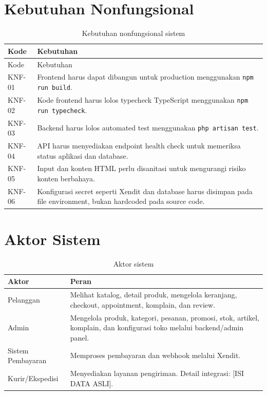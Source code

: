 \documentclass[12pt,a4paper]{report}
\begin{document}
\section{Kebutuhan Nonfungsional}
\begin{longtable}{p{}p{}}
\caption{Kebutuhan nonfungsional sistem}\\
\toprule
Kode & Kebutuhan \\
\midrule
\endfirsthead
\toprule
Kode & Kebutuhan \\
\midrule
\endhead
KNF-01 & Frontend harus dapat dibangun untuk production menggunakan \texttt{npm run build}. \\
KNF-02 & Kode frontend harus lolos typecheck TypeScript menggunakan \texttt{npm run typecheck}. \\
KNF-03 & Backend harus lolos automated test menggunakan \texttt{php artisan test}. \\
KNF-04 & API harus menyediakan endpoint health check untuk memeriksa status aplikasi dan database. \\
KNF-05 & Input dan konten HTML perlu disanitasi untuk mengurangi risiko konten berbahaya. \\
KNF-06 & Konfigurasi secret seperti Xendit dan database harus disimpan pada file environment, bukan hardcoded pada source code. \\
\bottomrule
\end{longtable}

\section{Aktor Sistem}
\begin{table}[H]
\centering
\caption{Aktor sistem}
\begin{tabular}{p{}p{}}
\toprule
Aktor & Peran \\
\midrule
Pelanggan & Melihat katalog, detail produk, mengelola keranjang, checkout, appointment, komplain, dan review. \\
Admin & Mengelola produk, kategori, pesanan, promosi, stok, artikel, komplain, dan konfigurasi toko melalui backend/admin panel. \\
Sistem Pembayaran & Memproses pembayaran dan webhook melalui Xendit. \\
Kurir/Ekspedisi & Menyediakan layanan pengiriman. Detail integrasi: [ISI DATA ASLI]. \\
\bottomrule
\end{tabular}
\end{table}
\end{document}
